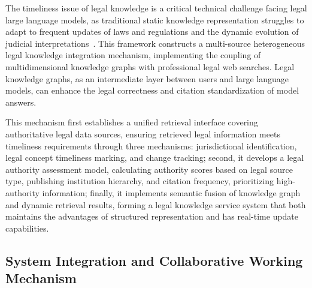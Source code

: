 \documentclass{article}
\theoremstyle{plain}
\theoremstyle{definition}
\begin{document}
The timeliness issue of legal knowledge is a critical technical challenge facing legal large language models, as traditional static knowledge representation struggles to adapt to frequent updates of laws and regulations and the dynamic evolution of judicial interpretations~\cite{Li2024}. This framework constructs a multi-source heterogeneous legal knowledge integration mechanism, implementing the coupling of multidimensional knowledge graphs with professional legal web searches. Legal knowledge graphs, as an intermediate layer between users and large language models, can enhance the legal correctness and citation standardization of model answers.

This mechanism first establishes a unified retrieval interface covering authoritative legal data sources, ensuring retrieved legal information meets timeliness requirements through three mechanisms: jurisdictional identification, legal concept timeliness marking, and change tracking; second, it develops a legal authority assessment model, calculating authority scores based on legal source type, publishing institution hierarchy, and citation frequency, prioritizing high-authority information; finally, it implements semantic fusion of knowledge graph and dynamic retrieval results, forming a legal knowledge service system that both maintains the advantages of structured representation and has real-time update capabilities.

\FloatBarrier
\subsection{System Integration and Collaborative Working Mechanism}
\label{sec3.3}
\end{document}

